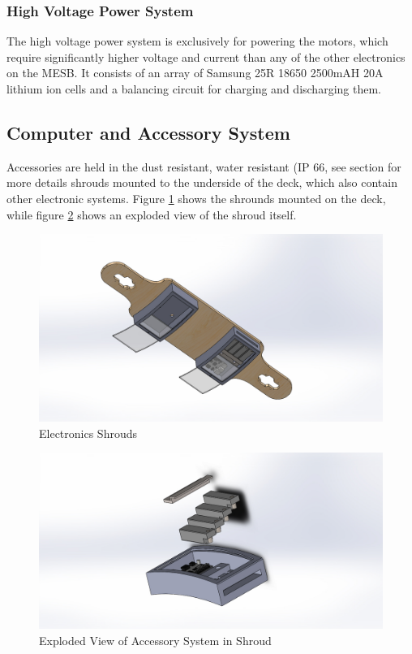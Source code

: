 \documentclass[titlepage, letterpaper,12pt]{article}
\begin{document}
\subsubsection{High Voltage Power System}
The high voltage power system is exclusively for powering the motors, which require significantly higher voltage and current than any of the other electronics on the MESB. It consists of an array of Samsung 25R 18650 2500mAH 20A lithium ion cells and a balancing circuit for charging and discharging them.
\subsection{Computer and Accessory System}
Accessories are held in the dust resistant, water resistant (IP 66, see section for more details shrouds mounted to the underside of the deck, which also contain other electronic systems. Figure \ref{access-full} shows the shrounds mounted on the deck, while figure \ref{access-expl} shows an exploded view of the shroud itself.

\begin{figure}
  \centering
  \includegraphics[width=.7\linewidth]{ModularAssembledBottomAngle}
  \caption{Electronics Shrouds}
  \label{access-full}
\end{figure}

\begin{figure}\centering
  \includegraphics[width=.7\linewidth]{ModPieceAngleExtend}
  \caption{Exploded View of Accessory System in Shroud}
  \label{access-expl}
\end{figure}
\end{document}

